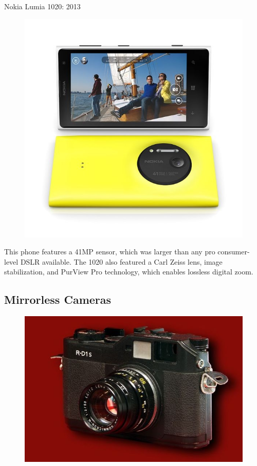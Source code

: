 \documentclass{beamer}
\begin{document}
	\begin{frame}{Nokia Lumia 1020: 2013}
		\begin{figure}
			\centering
			\includegraphics[scale=0.2]{139.jpg}
		\end{figure}
		This phone features a 41MP sensor, which was larger than any pro consumer-level DSLR available. The 1020 also featured a Carl Zeiss lens, image stabilization, and PurView Pro technology, which enables lossless digital zoom.
	\end{frame}
	\subsection{Mirrorless Cameras}
	\begin{frame}
		\begin{figure}
			\centering
			\includegraphics[scale=0.4]{140.jpg}
		\end{figure}
	\end{frame}
		
\end{document}
